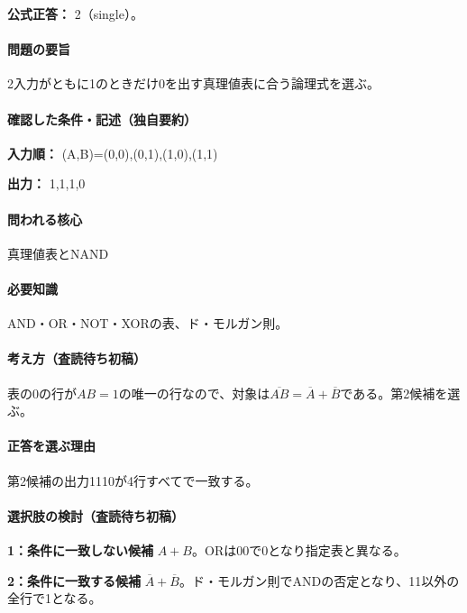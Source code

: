 \textbf{公式正答：} 2（single）。

\paragraph{問題の要旨} 2入力がともに1のときだけ0を出す真理値表に合う論理式を選ぶ。

\paragraph{確認した条件・記述（独自要約）}\mbox{}\par

\noindent\textbf{入力順：} (A,B)=\allowbreak{}(0,0),(0,1),(1,0),(1,1)\par

\noindent\textbf{出力：} 1,1,1,0\par

\paragraph{問われる核心} 真理値表とNAND

\paragraph{必要知識} AND・OR・NOT・XORの表、ド・モルガン則。

\paragraph{考え方（査読待ち初稿）} 表の0の行が\(AB=1\)の唯一の行なので、対象は\(\overline{AB}=\overline A+\overline B\)である。第2候補を選ぶ。

\paragraph{正答を選ぶ理由} 第2候補の出力1110が4行すべてで一致する。

\paragraph{選択肢の検討（査読待ち初稿）}\mbox{}\par

\noindent\textbf{1：条件に一致しない候補} \(A+B\)。ORは00で0となり指定表と異なる。\par

\noindent\textbf{2：条件に一致する候補} \(\overline A+\overline B\)。ド・モルガン則でANDの否定となり、11以外の全行で1となる。\par

